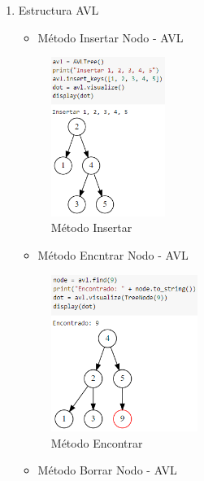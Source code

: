 \documentclass{article}
\begin{document}
    \begin{enumerate}
    
        \item Estructura AVL

\begin{itemize}
   \item Método Insertar Nodo - AVL
\end{itemize}

\begin{figure}[H]
\centering
\includegraphics[width=0.35\textwidth]{Img/arbol_AVL.png}
\caption{Método Insertar}
\end{figure}

\begin{itemize}
   \item Método Encntrar Nodo - AVL
\end{itemize}

\begin{figure}[H]
\centering
\includegraphics[width=0.45\textwidth]{Img/met_encontar.png}
\caption{Método Encontrar}
\end{figure}

\begin{itemize}
   \item Método Borrar Nodo - AVL
\end{itemize}


\end{enumerate}
\end{document}
